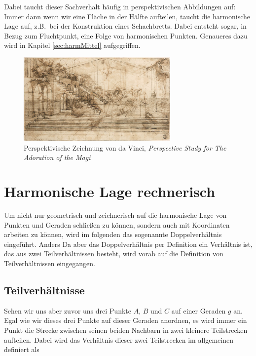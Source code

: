 \documentclass[12pt,a4paper]{article}
\begin{document}
Dabei taucht dieser Sachverhalt häufig in perspektivischen Abbildungen auf: Immer dann wenn wir eine Fläche in der Hälfte aufteilen, taucht die harmonische Lage auf, z.B.~bei der Konstruktion eines Schachbretts. Dabei entsteht sogar, in Bezug zum Fluchtpunkt, eine Folge von harmonischen Punkten. Genaueres dazu wird in Kapitel \ref{sec:harmMittel} aufgegriffen.

\begin{figure}[htbp]
\centering
\includegraphics[width=0.7\textwidth]{Bilder/daVinvi1.jpg}
\caption{Perspektivische Zeichnung von da Vinci, \textit{Perspective Study for The Adoration of the Magi}\protect\footnotemark}
\end{figure}


\newpage
\section{Harmonische Lage rechnerisch}
Um nicht nur geometrisch und zeichnerisch auf die harmonische Lage von Punkten und Geraden schließen zu können, sondern auch mit Koordinaten arbeiten zu können, wird im folgenden das sogenannte Doppelverhältnis eingeführt. Anders Da aber das Doppelverhältnis per Definition ein Verhältnis ist, das aus zwei Teilverhältnissen besteht, wird vorab auf die Definition von Teilverhältnissen eingegangen.

\subsection{Teilverhältnisse}
\label{subsec:teilverh}
Sehen wir uns aber zuvor uns drei Punkte $A$, $B$ und $C$ auf einer Geraden $g$ an. Egal wie wir dieses drei Punkte auf dieser Geraden anordnen, es wird immer ein Punkt die Strecke zwischen seinen beiden Nachbarn in zwei kleinere Teilstrecken aufteilen. Dabei wird das Verhältnis dieser zwei Teilstrecken im allgemeinen definiert als
\end{document}
